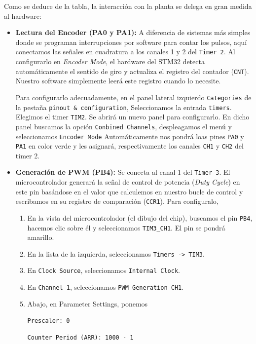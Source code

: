 \documentclass[10pt,a4paper]{report}
\begin{document}
Como se deduce de la tabla, la interacción con la planta se delega en gran medida al hardware:
\begin{itemize}
	\item \textbf{Lectura del Encoder (PA0 y PA1):}
A diferencia de sistemas más simples donde se programan interrupciones por software para contar los pulsos, aquí conectamos las señales en cuadratura a los canales 1 y 2 del \texttt{Timer 2}. Al configurarlo en \textit{Encoder Mode}, el hardware del STM32 detecta automáticamente el sentido de giro y actualiza el registro del contador (\texttt{CNT}). Nuestro software simplemente leerá este registro cuando lo necesite.

Para configurarlo adecuadamente, en el panel lateral izquierdo \texttt{Categories} de la pestaña \texttt{pinout \& configuration}, Seleccionamos la entrada \texttt{timers}. Elegimos el timer \texttt{TIM2}. Se abrirá un nuevo panel para configurarlo. En dicho panel buscamos la opción \texttt{Conbined Channels}, despleagamos el menú y seleccionamos \texttt{Encoder Mode} Automáticamente nos pondrá loas pines \texttt{PA0} y \texttt{PA1} en color verde y les asignará, respectivamente los canales \texttt{CH1} y \texttt{CH2} del timer 2.

	
	\item \textbf{Generación de PWM (PB4):} Se conecta al canal 1 del \texttt{Timer 3}. El microcontrolador generará la señal de control de potencia (\textit{Duty Cycle}) en este pin basándose en el valor que calculemos en nuestro bucle de control y escribamos en su registro de comparación (\texttt{CCR1}).
Para configuralo,
\begin{enumerate}
\item En la vista del microcontrolador (el dibujo del chip), buscamos el pin \texttt{PB4}, hacemos clic sobre él y seleccionamos \texttt{TIM3\_CH1}. El pin se pondrá amarillo.
	\item En la lista de la izquierda, seleccionamos  \texttt{Timers -> TIM3}.
	\item En \texttt{Clock Source}, seleccionamos \texttt{Internal Clock}.
	\item En \texttt{Channel 1}, seleccionamos \texttt{PWM Generation CH1}.
	\item  Abajo, en Parameter Settings, ponemos

    \texttt{Prescaler: 0}

    \texttt{Counter Period (ARR): 1000 - 1} 
\end{enumerate}







\end{itemize}
\end{document}

